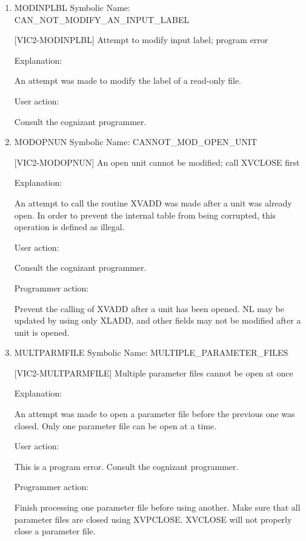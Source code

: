 \begin{enumerate}
 Error message too long; program error

Explanation:

The error message given on a *\_MESS optional has exceeded the
maximum string size allowed (132 characters).

User action:

Consult the cognizant programmer.


\item MODINPLBL Symbolic Name: CAN\_NOT\_MODIFY\_AN\_INPUT\_LABEL

[VIC2-MODINPLBL] Attempt to modify input label; program error

Explanation:

An attempt was made to modify the label of a read-only file.

User action:

Consult the cognizant programmer.


\item MODOPNUN Symbolic Name: CANNOT\_MOD\_OPEN\_UNIT

[VIC2-MODOPNUN] An open unit cannot be modified; call XVCLOSE first

Explanation:

An attempt to call the routine XVADD was made after a unit was
already open.  In order to prevent the internal table from being
corrupted, this operation is defined as illegal.

User action:

Consult the cognizant programmer.

Programmer action:

Prevent the calling of XVADD after a unit has been opened.
NL may be updated by using only XLADD, and other fields may
not be modified after a unit is opened.


\item MULTPARMFILE Symbolic Name: MULTIPLE\_PARAMETER\_FILES

[VIC2-MULTPARMFILE] Multiple parameter files cannot be open at once

Explanation:

An attempt was made to open a parameter file before the previous
one was closed.  Only one parameter file can be open at a time.

User action:

This is a program error.  Consult the cognizant programmer.

Programmer action:

Finish processing one parameter file before using another.
Make sure that all parameter files are closed using XVPCLOSE.
XVCLOSE will not properly close a parameter file.



\end{enumerate}
